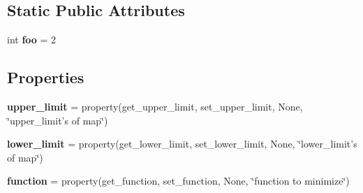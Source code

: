 \subsection*{Static Public Attributes}
\begin{DoxyCompactItemize}
\item 
\hypertarget{classsrc_1_1common__entities_1_1terrain_1_1Terrain_a59963644c583f161e7642f78494deac6}{
int {\bfseries foo} = 2}
\label{classsrc_1_1common__entities_1_1terrain_1_1Terrain_a59963644c583f161e7642f78494deac6}

\end{DoxyCompactItemize}
\subsection*{Properties}
\begin{DoxyCompactItemize}
\item 
\hypertarget{classsrc_1_1common__entities_1_1terrain_1_1Terrain_a499478b6282d241d9a12a451059de50b}{
{\bfseries upper\_\-limit} = property(get\_\-upper\_\-limit, set\_\-upper\_\-limit, None, \char`\"{}upper\_\-limit's of map\char`\"{})}
\label{classsrc_1_1common__entities_1_1terrain_1_1Terrain_a499478b6282d241d9a12a451059de50b}

\item 
\hypertarget{classsrc_1_1common__entities_1_1terrain_1_1Terrain_ae9ce4fd6af189b1bf3a9c103dcba4ddb}{
{\bfseries lower\_\-limit} = property(get\_\-lower\_\-limit, set\_\-lower\_\-limit, None, \char`\"{}lower\_\-limit's of map\char`\"{})}
\label{classsrc_1_1common__entities_1_1terrain_1_1Terrain_ae9ce4fd6af189b1bf3a9c103dcba4ddb}

\item 
\hypertarget{classsrc_1_1common__entities_1_1terrain_1_1Terrain_a1988253e790ba56a2cdb1b73c1be98ea}{
{\bfseries function} = property(get\_\-function, set\_\-function, None, \char`\"{}function to minimize\char`\"{})}
\label{classsrc_1_1common__entities_1_1terrain_1_1Terrain_a1988253e790ba56a2cdb1b73c1be98ea}

\end{DoxyCompactItemize}


